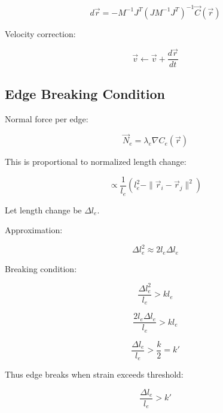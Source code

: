 \[
d\vec{r}
=
-
M^{-1}
J^T
\left(
J M^{-1} J^T
\right)^{-1}
\vec{C}(\vec{r})
\]

Velocity correction:

\[
\vec{v}
\leftarrow
\vec{v}
+
\frac{d\vec{r}}{dt}
\]

\subsection*{Edge Breaking Condition}

Normal force per edge:

\[
\vec{N}_e
=
\lambda_e
\nabla C_e(\vec{r})
\]

This is proportional to normalized length change:

\[
\propto
\frac{1}{l_e}
\left(
l_e^2 -
\|\vec{r}_i - \vec{r}_j\|^2
\right)
\]

Let length change be $\Delta l_e$.

Approximation:

\[
\Delta l_e^2
\approx
2 l_e \Delta l_e
\]

Breaking condition:

\[
\frac{\Delta l_e^2}{l_e}
>
k l_e
\]

\[
\frac{2 l_e \Delta l_e}{l_e}
>
k l_e
\]

\[
\frac{\Delta l_e}{l_e}
>
\frac{k}{2}
=
k'
\]

Thus edge breaks when strain exceeds threshold:

\[
\boxed{
\frac{\Delta l_e}{l_e}
>
k'
}
\]
